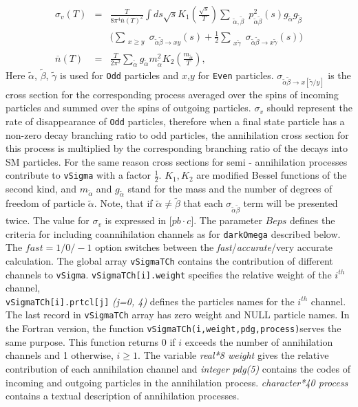 \documentclass[12pt,a4paper]{article}
\begin{document}
\begin{eqnarray}
\nonumber
\sigma_v(T) &=& \frac{T}{8\pi^4  \overline{n}(T)^2} \int ds\sqrt{s} K_1\left(\frac{\sqrt{s}}{T}\right)   
\sum_{\substack{
\tilde\alpha ,\tilde\beta }}  p_{\tilde\alpha\tilde\beta}^2(s) g_{\tilde\alpha} g_{\tilde\beta} \\
&&\big(
\sum_{\substack{ x \ge y }}  
 {\sigma}_{\tilde\alpha\tilde\beta\to x y}(s)+ \frac{1}{2}\sum_{\substack{x  \tilde\gamma }}
 {\sigma}_{\tilde\alpha\tilde\beta\to x\tilde\gamma}(s)
  \big)
\label{sigmaV}\\
\overline{n}(T)&=&\frac{T}{2\pi^2 } \sum_{\tilde\alpha} g_{\tilde\alpha} m^2_{\tilde\alpha} K_2(\frac{m_{\tilde\alpha}}{T}),
\end{eqnarray}
Here  $\tilde\alpha$, $\tilde\beta$, $\tilde\gamma$  is used for  {\tt Odd} particles and $x$,$y$
for {\tt Even}  particles.    ${\sigma}_{\tilde\alpha\tilde\beta\to x[\tilde\gamma/y]} $ is the cross section for the 
corresponding  process  averaged over the spins of incoming particles and summed
over the spins of outgoing particles. $\sigma_v$  should represent the rate of disappearance  of  {\tt Odd} particles, therefore
when a final state particle has a non-zero decay branching ratio to odd particles, the  annihilation cross section for this process is multiplied by the corresponding branching ratio of the decays into SM particles. For the same reason cross sections for  semi - annihilation processes  contribute to {\tt vSigma} with a factor $\frac{1}{2}$. $K_1,K_2$ are modified Bessel functions of the second kind, and 
$m_{\tilde\alpha}$ and $g_{\tilde\alpha}$ stand for the  mass and the number of degrees of freedom of particle $\tilde\alpha$.
Note, that if $\tilde\alpha \ne \tilde\beta$ that each
${\sigma}_{\tilde\alpha\tilde\beta}$ term will be presented  twice.
The value for $\sigma_v$ 
is expressed in [$pb\cdot c$].  The parameter $Beps$ defines the criteria for including coannihilation
channels as for {\tt darkOmega} described below.
The $fast=1/0/-1$ option switches between the {\it fast}/{\it accurate}/{very accurate} calculation. 
The global array {\tt vSigmaTCh} contains the 
contribution of different channels to {\tt vSigma}. \verb|vSigmaTCh[i].weight| specifies the relative
weight of the $i^{th}$ channel, \\
\verb|vSigmaTCh[i].prtcl[j]|  {\it (j=0, 4)}  defines the particles names for the $i^{th}$
channel.\\
The last record in \verb|vSigmaTCh| array has zero weight and 
NULL particle names.  In the Fortran version, the function 
 \verb|vSigmaTCh(i,weight,pdg,process)|serves the same purpose.  This function returns 0
if $i$  exceeds the number of annihilation  channels and 1 otherwise, $i\ge 1$. 
 The variable {\it real*8 weight} gives the relative contribution of each
annihilation channel and {\it integer pdg(5)} contains the codes of incoming and
outgoing particles in the  annihilation process.  {\it character*40  process}
contains a textual description of annihilation processes.\\
\end{document}

